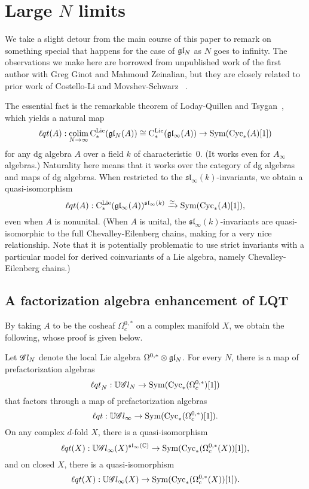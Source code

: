 \section{Large $N$ limits} \label{sec: largeN}


\def\cycls{{\rm Cyc}_*}
\def\lqt{{\ell q t}}
\def\colim{{\rm colim}}
\def\sl{\mathfrak{sl}}

We take a slight detour from the main course of this paper to remark on something special that happens for the case of $\mathfrak{g} \mathfrak{l}_N$ as $N$ goes to infinity.
The observations we make here are borrowed from unpublished work of the first author with Greg Ginot and Mahmoud Zeinalian,
but they are closely related to prior work of Costello-Li \cite{CLbcov2} and Movshev-Schwarz~\cite{} .

The essential fact is the remarkable theorem of Loday-Quillen \cite{LQ} and Tsygan~\cite{Tsy},
which yields a natural map 
\[
\lqt(A) : \underset{N \to \infty}{\colim} \, \cliels(\gl_N(A)) \cong \cliels(\gl_\infty(A)) \to \Sym(\cycls(A)[1])
\]
for any dg algebra $A$ over a field $k$ of characteristic~0.
(It works even for $A_\infty$ algebras.)
Naturality here means that it works over the category of dg algebras and maps of dg algebras.
When restricted to the $\sl_\infty(k)$-invariants, we obtain a quasi-isomorphism
\[
\lqt(A) :\cliels(\gl_\infty(A))^{\sl_\infty(k)} \xto{\simeq} \Sym(\cycls(A)[1]),
\]
even when $A$ is nonunital. 
(When $A$ is unital, the $\sl_\infty(k)$-invariants are quasi-isomorphic to the full Chevalley-Eilenberg chains,
making for a very nice relationship. 
Note that it is potentially problematic to use strict invariants with a particular model for derived coinvariants of a Lie algebra,
namely Chevalley-Eilenberg chains.)

\subsection{A factorization algebra enhancement of LQT}

By taking $A$ to be the cosheaf $\Omega^{0,*}_c$ on a complex manifold $X$,
we obtain the following, whose proof is given below. 

\begin{prop}
\label{prop: cycfact}
Let $\mathscr G l_N$ denote the local Lie algebra $\Omega^{0,*} \otimes \mathfrak{g} \mathfrak{l}_N$.
For every $N$, there is a map of prefactorization algebras
\[
\lqt_N: \UU \sG l_N \to \Sym(\cycls(\Omega^{0,*}_c)[1])
\]
that factors through a map of prefactorization algebras
\[
\lqt: \UU \sG l_\infty \to \Sym(\cycls(\Omega^{0,*}_c)[1]).
\]
On any complex $d$-fold $X$, there is a quasi-isomorphism
\[
\lqt(X): \UU \sG l_\infty(X)^{\sl_\infty(\CC)} \to \Sym(\cycls(\Omega^{0,*}_c(X))[1]),
\]
and on closed $X$, there is a quasi-isomorphism
\[
\lqt(X): \UU \sG l_\infty(X) \to \Sym(\cycls(\Omega^{0,*}_c(X))[1]).
\]
\end{prop}

